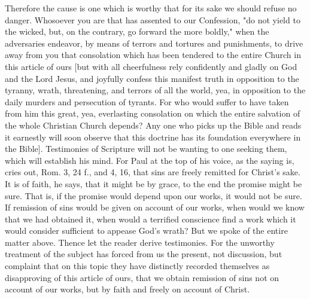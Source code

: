 Therefore the cause is one which is worthy that for its sake we
should refuse no danger.  Whosoever you are that has assented to our
Confession, "do not yield to the wicked, but, on the contrary, go
forward the more boldly," when the adversaries endeavor, by means of
terrors and tortures and punishments, to drive away from you that
consolation which has been tendered to the entire Church in this
article of ours [but with all cheerfulness rely confidently and
gladly on God and the Lord Jesus, and joyfully confess this manifest
truth in opposition to the tyranny, wrath, threatening, and terrors
of all the world, yea, in opposition to the daily murders and
persecution of tyrants.  For who would suffer to have taken from him
this great, yea, everlasting consolation on which the entire
salvation of the whole Christian Church depends?  Any one who picks
up the Bible and reads it earnestly will soon observe that this
doctrine has its foundation everywhere in the Bible].  Testimonies of
Scripture will not be wanting to one seeking them, which will
establish his mind.  For Paul at the top of his voice, as the saying
is, cries out, Rom. 3, 24 f., and 4, 16, that sins are freely
remitted for Christ's sake.  It is of faith, he says, that it might
be by grace, to the end the promise might be sure.  That is, if the
promise would depend upon our works, it would not be sure.  If
remission of sins would be given on account of our works, when would
we know that we had obtained it, when would a terrified conscience
find a work which it would consider sufficient to appease God's
wrath?  But we spoke of the entire matter above.  Thence let the
reader derive testimonies.  For the unworthy treatment of the subject
has forced from us the present, not discussion, but complaint that on
this topic they have distinctly recorded themselves as disapproving
of this article of ours, that we obtain remission of sins not on
account of our works, but by faith and freely on account of Christ.

